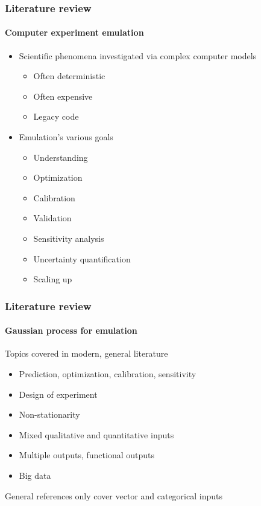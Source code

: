 \documentclass{snedecorbeamer}
\begin{document}
\begin{frame}
  \frametitle{Literature review}
  \framesubtitle{Computer experiment emulation}

  \begin{itemize}
  \item<2-> Scientific phenomena investigated via complex computer
    models~\citep{sacks1989,currin1991,koehler1996}
    \begin{itemize}
    \item Often deterministic
    \item Often expensive
    \item Legacy code
    \end{itemize}
  \item<3-> Emulation's various goals
    \begin{itemize}
    \item Understanding
    \item Optimization~\citep{jones1998,ohagan1992}
    \item Calibration~\citep{higdon2008,higdon2008a,kennedy2001}
    \item Validation~\citep{bayarri2007}
    \item Sensitivity analysis~\citep{campbell2006,iooss2009,morris2018}
    \item Uncertainty quantification
    \item Scaling up
    \end{itemize}
  \end{itemize}
\end{frame}

\begin{frame}
  \frametitle{Literature review}
  \framesubtitle{Gaussian process for emulation}

  Topics covered in modern, general
  literature~\citep{santner2003,santner2018,gramacy2020}
  \begin{itemize}
  \item Prediction, optimization, calibration, sensitivity
  \item Design of experiment
  \item Non-stationarity
  \item Mixed qualitative and quantitative inputs
  \item Multiple outputs, functional outputs
  \item Big data
  \end{itemize}

  \vfill{}
  \begin{exampleblock}{}
    General references only cover vector and categorical inputs
  \end{exampleblock}
\end{frame}
\end{document}
